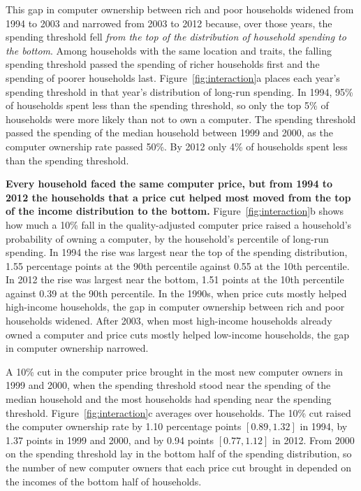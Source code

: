 \documentclass[11pt]{article}
\begin{document}
This gap in computer ownership between rich and poor households widened from 1994 to 2003 and narrowed from 2003 to 2012 because, over those years, the spending threshold fell \emph{from the top of the distribution of household spending to the bottom}. Among households with the same location and traits, the falling spending threshold passed the spending of richer households first and the spending of poorer households last. Figure~\ref{fig:interaction}a places each year's spending threshold in that year's distribution of long-run spending. In 1994, 95\% of households spent less than the spending threshold, so only the top 5\% of households were more likely than not to own a computer. The spending threshold passed the spending of the median household between 1999 and 2000, as the computer ownership rate passed 50\%. By 2012 only 4\% of households spent less than the spending threshold.

\textbf{Every household faced the same computer price, but from 1994 to 2012 the households that a price cut helped most moved from the top of the income distribution to the bottom.} Figure~\ref{fig:interaction}b shows how much a 10\% fall in the quality-adjusted computer price raised a household's probability of owning a computer, by the household's percentile of long-run spending. In 1994 the rise was largest near the top of the spending distribution, 1.55 percentage points at the 90th percentile against 0.55 at the 10th percentile. In 2012 the rise was largest near the bottom, 1.51 points at the 10th percentile against 0.39 at the 90th percentile. In the 1990s, when price cuts mostly helped high-income households, the gap in computer ownership between rich and poor households widened. After 2003, when most high-income households already owned a computer and price cuts mostly helped low-income households, the gap in computer ownership narrowed.

A 10\% cut in the computer price brought in the most new computer owners in 1999 and 2000, when the spending threshold stood near the spending of the median household and the most households had spending near the spending threshold. Figure~\ref{fig:interaction}c averages over households. The 10\% cut raised the computer ownership rate by 1.10 percentage points $[0.89, 1.32]$ in 1994, by 1.37 points in 1999 and 2000, and by 0.94 points $[0.77, 1.12]$ in 2012. From 2000 on the spending threshold lay in the bottom half of the spending distribution, so the number of new computer owners that each price cut brought in depended on the incomes of the bottom half of households.
\end{document}
